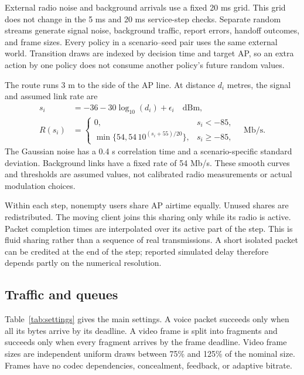 \documentclass[11pt,a4paper]{article}
\begin{document}
External radio noise and background arrivals use a fixed 20 ms grid. This grid does not change in the 5 ms and 20 ms service-step checks. Separate random streams generate signal noise, background traffic, report errors, handoff outcomes, and frame sizes. Every policy in a scenario--seed pair uses the same external world. Transition draws are indexed by decision time and target AP, so an extra action by one policy does not consume another policy's future random values.

The route runs 3 m to the side of the AP line. At distance $d_i$ metres, the signal and assumed link rate are
\begin{align}
 s_i &= -36-30\log_{10}(d_i)+\epsilon_i \quad\text{dBm},\\
 R(s_i)&=\begin{cases}0,&s_i<-85,\\\min\{54,54\,10^{(s_i+55)/20}\},&s_i\geq-85,\end{cases}\quad\text{Mb/s}.
\end{align}
The Gaussian noise has a 0.4 s correlation time and a scenario-specific standard deviation. Background links have a fixed rate of 54 Mb/s. These smooth curves and thresholds are assumed values, not calibrated radio measurements or actual modulation choices.

Within each step, nonempty users share AP airtime equally. Unused shares are redistributed. The moving client joins this sharing only while its radio is active. Packet completion times are interpolated over its active part of the step. This is fluid sharing rather than a sequence of real transmissions. A short isolated packet can be credited at the end of the step; reported simulated delay therefore depends partly on the numerical resolution.

\subsection{Traffic and queues}
Table~\ref{tab:settings} gives the main settings. A voice packet succeeds only when all its bytes arrive by its deadline. A video frame is split into fragments and succeeds only when every fragment arrives by the frame deadline. Video frame sizes are independent uniform draws between 75\% and 125\% of the nominal size. Frames have no codec dependencies, concealment, feedback, or adaptive bitrate.
\end{document}
